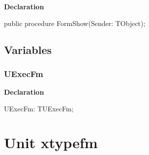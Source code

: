 \documentclass{report}
\newif\ifpdf
\begin{document}
\label{updexec.TUExecFm-FormShow}
\begin{list}{}{
\setlength{\itemindent}{0cm}
\setlength{\listparindent}{0cm}
\setlength{\leftmargin}{\evensidemargin}
\addtolength{\leftmargin}{\tmplength}
\settowidth{\labelsep}{X}
\addtolength{\leftmargin}{\labelsep}
\setlength{\labelwidth}{\tmplength}
}
\item[\textbf{Declaration}\hfill]
\ifpdf
\begin{flushleft}
\fi
\begin{ttfamily}
public procedure FormShow(Sender: TObject);\end{ttfamily}

\ifpdf
\end{flushleft}
\fi

\end{list}
\section{Variables}
\ifpdf
\subsection*{\large{\textbf{UExecFm}}\normalsize\hspace{1ex}\hrulefill}
\else
\subsection*{UExecFm}
\fi
\label{updexec-UExecFm}
\begin{list}{}{
\setlength{\itemindent}{0cm}
\setlength{\listparindent}{0cm}
\setlength{\leftmargin}{\evensidemargin}
\addtolength{\leftmargin}{\tmplength}
\settowidth{\labelsep}{X}
\addtolength{\leftmargin}{\labelsep}
\setlength{\labelwidth}{\tmplength}
}
\item[\textbf{Declaration}\hfill]
\ifpdf
\begin{flushleft}
\fi
\begin{ttfamily}
UExecFm: TUExecFm;\end{ttfamily}

\ifpdf
\end{flushleft}
\fi

\end{list}
\chapter{Unit xtypefm}
\label{xtypefm}
\end{document}
